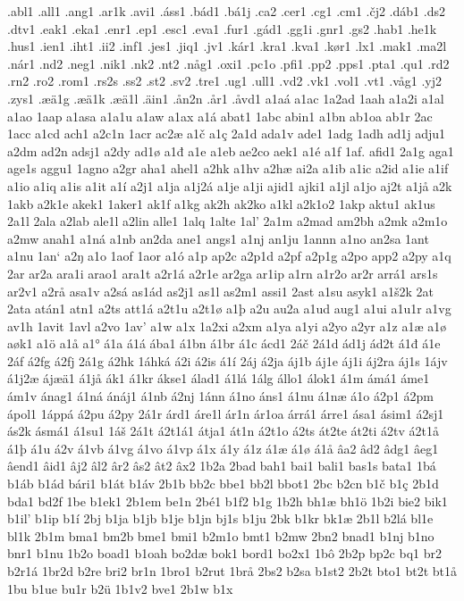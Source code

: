 .abl1
.all1
.ang1
.ar1k
.avi1
.áss1
.bád1
.bá1j
.ca2
.cer1
.cg1
.cm1
.čj2
.dáb1
.ds2
.dtv1
.eak1
.eka1
.enr1
.ep1
.esc1
.eva1
.fur1
.gád1
.gg1i
.gnr1
.gs2
.hab1
.he1k
.hus1
.ien1
.iht1
.ii2
.inf1
.jes1
.jiq1
.jv1
.kár1
.kra1
.kva1
.kør1
.lx1
.mak1
.ma2l
.nár1
.nd2
.neg1
.nik1
.nk2
.nt2
.någ1
.oxi1
.pc1o
.pfi1
.pp2
.pps1
.pta1
.qu1
.rd2
.rn2
.ro2
.rom1
.rs2s
.ss2
.st2
.sv2
.tre1
.ug1
.ull1
.vd2
.vk1
.vol1
.vt1
.våg1
.yj2
.zys1
.æä1g
.æä1k
.æä1l
.äin1
.ån2n
.år1
.åvd1
a1aá
a1ac
1a2ad
1aah
a1a2i
a1al
a1ao
1aap
a1asa
a1a1u
a1aw
a1ax
a1á
abat1
1abc
abin1
a1bn
ab1oa
ab1r
2ac
1acc
a1cd
ach1
a2c1n
1acr
ac2æ
a1č
a1ç
2a1d
ada1v
ade1
1adg
1adh
ad1j
adju1
a2dm
ad2n
adsj1
a2dy
ad1ø
a1đ
a1e
a1eb
ae2co
aek1
a1é
a1f
1af.
afid1
2a1g
aga1
age1s
aggu1
1agno
a2gr
aha1
ahel1
a2hk
a1hv
a2hæ
ai2a
a1ib
a1ic
a2id
a1ie
a1if
a1io
a1iq
a1is
a1it
a1í
a2j1
a1ja
a1j2á
a1je
a1ji
ajid1
ajki1
a1jl
a1jo
aj2t
a1jå
a2k
1akb
a2k1e
akek1
1aker1
ak1f
a1kg
ak2h
ak2ko
a1kl
a2k1o2
1akp
aktu1
ak1us
2a1l
2ala
a2lab
ale1l
a2lin
alle1
1alq
1alte
1al'
2a1m
a2mad
am2bh
a2mk
a2m1o
a2mw
anah1
a1ná
a1nb
an2da
ane1
angs1
a1nj
an1ju
1annn
a1no
an2sa
1ant
a1nu
1an`
a2ŋ
a1o
1aof
1aor
a1ó
a1p
ap2c
a2p1d
a2pf
a2p1g
a2po
app2
a2py
a1q
2ar
ar2a
ara1i
arao1
ara1t
a2r1á
a2r1e
ar2ga
ar1ip
a1rn
a1r2o
ar2r
arrá1
ars1s
ar2v1
a2rå
asa1v
a2sá
as1ád
as2j1
as1l
as2m1
assi1
2ast
a1su
asyk1
a1š2k
2at
2ata
atán1
atn1
a2ts
att1á
a2t1u
a2t1ø
a1þ
a2u
au2a
a1ud
aug1
a1ui
a1u1r
a1vg
av1h
1avit
1avl
a2vo
1av'
a1w
a1x
1a2xi
a2xm
a1ya
a1yi
a2yo
a2yr
a1z
a1æ
a1ø
aøk1
a1ö
a1å
a1°
á1a
á1á
ába1
á1bn
á1br
á1c
ácd1
2áč
2á1d
ád1j
ád2t
á1đ
á1e
2áf
á2fg
á2fj
2á1g
á2hk
1áhká
á2i
á2is
á1í
2áj
á2ja
áj1b
áj1e
áj1i
áj2ra
áj1s
1ájv
á1j2æ
ájæä1
á1jå
ák1
á1kr
ákse1
álad1
á1lá
1álg
állo1
álok1
á1m
ámá1
áme1
ám1v
ánag1
á1ná
ánáj1
á1nb
á2nj
1ánn
á1no
áns1
á1nu
á1næ
á1o
á2p1
á2pm
ápol1
1áppá
á2pu
á2py
2á1r
árd1
áre1l
ár1n
ár1oa
árrá1
árre1
ása1
ásim1
á2sj1
ás2k
ásmá1
á1su1
1áš
2á1t
á2t1á1
átja1
át1n
á2t1o
á2ts
át2te
át2ti
á2tv
á2t1å
á1þ
á1u
á2v
á1vb
á1vg
á1vo
á1vp
á1x
á1y
á1z
á1æ
á1ø
á1å
âa2
âd2
âdg1
âeg1
âend1
âid1
âj2
âl2
âr2
âs2
ât2
âx2
1b2a
2bad
bah1
bai1
bali1
bas1s
bata1
1bá
b1áb
b1ád
bári1
b1át
b1áv
2b1b
bb2c
bbe1
bb2l
bbot1
2bc
b2cn
b1č
b1ç
2b1d
bda1
bd2f
1be
b1ek1
2b1em
be1n
2bé1
b1f2
b1g
1b2h
bh1æ
bh1ö
1b2i
bie2
bik1
b1il'
b1ip
b1í
2bj
b1ja
b1jb
b1je
b1jn
bj1s
b1ju
2bk
b1kr
bk1æ
2b1l
b2lá
bl1e
bl1k
2b1m
bma1
bm2b
bme1
bmi1
b2m1o
bmt1
b2mw
2bn2
bnad1
b1nj
b1no
bnr1
b1nu
1b2o
boad1
b1oah
bo2dæ
bok1
bord1
bo2x1
1bô
2b2p
bp2c
bq1
br2
b2r1á
1br2d
b2re
bri2
br1n
1bro1
b2rut
1brå
2bs2
b2sa
b1st2
2b2t
bto1
bt2t
bt1å
1bu
b1ue
bu1r
b2ü
1b1v2
bve1
2b1w
b1x
